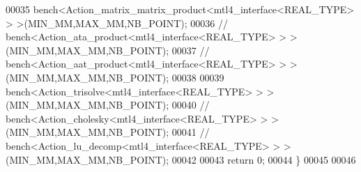 \begin{DoxyCode}
00035   bench<Action\_matrix\_matrix\_product<mtl4\_interface<REAL\_TYPE> > >(MIN\_MM,MAX\_MM,NB\_POINT);
00036 \textcolor{comment}{//   bench<Action\_ata\_product<mtl4\_interface<REAL\_TYPE> > >(MIN\_MM,MAX\_MM,NB\_POINT);}
00037 \textcolor{comment}{//   bench<Action\_aat\_product<mtl4\_interface<REAL\_TYPE> > >(MIN\_MM,MAX\_MM,NB\_POINT);}
00038 
00039   bench<Action\_trisolve<mtl4\_interface<REAL\_TYPE> > >(MIN\_MM,MAX\_MM,NB\_POINT);
00040 \textcolor{comment}{//   bench<Action\_cholesky<mtl4\_interface<REAL\_TYPE> > >(MIN\_MM,MAX\_MM,NB\_POINT);}
00041 \textcolor{comment}{//   bench<Action\_lu\_decomp<mtl4\_interface<REAL\_TYPE> > >(MIN\_MM,MAX\_MM,NB\_POINT);}
00042 
00043   \textcolor{keywordflow}{return} 0;
00044 \}
00045 
00046 
\end{DoxyCode}
